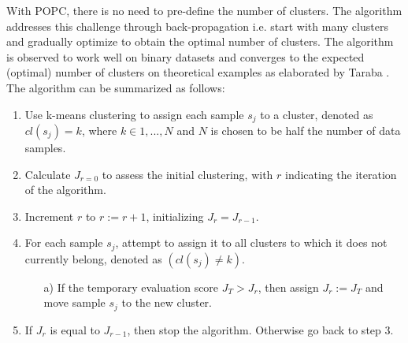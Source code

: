 \documentclass[AMA,Times1COL]{WileyNJDv5} %
\begin{document}
	With POPC, there is no need to pre-define the number of clusters. The algorithm addresses this challenge through back-propagation i.e. start with many clusters and gradually optimize to obtain the optimal number of clusters. The algorithm is observed to work well on binary datasets and converges to the expected (optimal) number of clusters on theoretical examples as elaborated by Taraba \cite{taraba2017clustering}. The algorithm can be summarized as follows:
	\begin{enumerate}
		\item Use k-means clustering to assign each sample $s_j$ to a cluster, denoted as $cl(s_j) = k$, where $k \in {1, ..., N}$ and $N$ is chosen to be half the number of data samples.
		\item Calculate $J_{r=0}$ to assess the initial clustering, with $r$ indicating the iteration of the algorithm.
		\item Increment $r$ to $r := r + 1$, initializing $J_r = J_{r-1}$.
		\item For each sample $s_j$, attempt to assign it to all clusters to which it does not currently belong, denoted as $(cl(s_j) \neq k)$.
		\begin{enumerate}
			\item [a)] If the temporary evaluation score $J_T > J_r$, then assign $J_r := J_T$ and move sample $s_j$ to the new cluster. 
		\end{enumerate}
		\item If $J_r$ is equal to $J_{r-1}$, then stop the algorithm. Otherwise go back to step 3.
	\end{enumerate}
	
\end{document}
